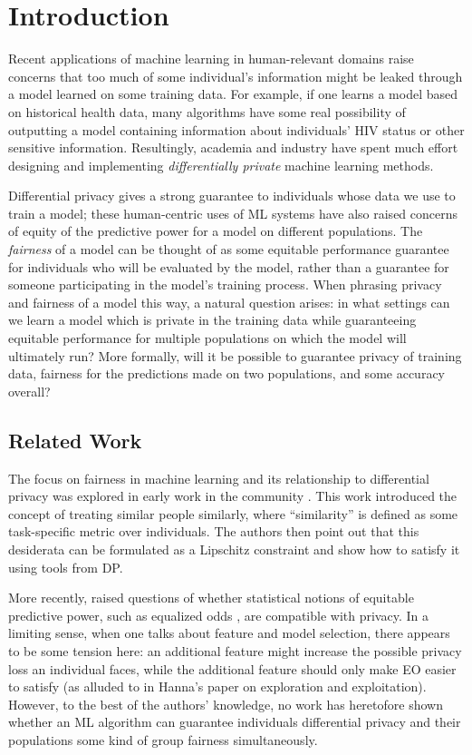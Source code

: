 
\section{Introduction}
Recent applications of machine learning in human-relevant domains
raise concerns that too much of some individual's information might be
leaked through a model learned on some training data. For example, if
one learns a model based on historical health data, many algorithms
have some real possibility of outputting a model containing
information about individuals' HIV status or other sensitive
information.  Resultingly, academia and industry have spent much
effort designing and implementing \emph{differentially private}
machine learning methods.

Differential privacy gives a strong guarantee to individuals whose
data we use to train a model; these human-centric uses of ML systems
have also raised concerns of equity of the predictive power for a
model on different populations. The \emph{fairness} of a model can be
thought of as some equitable performance guarantee for individuals who
will be evaluated by the model, rather than a guarantee for someone
participating in the model's training process. When phrasing privacy
and fairness of a model this way, a natural question arises: in what
settings can we learn a model which is private in the training data
while guaranteeing equitable performance for multiple populations on
which the model will ultimately run? More formally, will it be
possible to guarantee privacy of training data, fairness for the
predictions made on two populations, and some accuracy overall?


\subsection{Related Work}

The focus on fairness in machine learning and its relationship to
differential privacy was explored in early work in the community \citep{dworkfta}. This work introduced the concept of
treating similar people similarly, where ``similarity'' is defined as
some task-specific metric over individuals.  The authors then point
out that this desiderata can be formulated as a Lipschitz constraint
and show how to satisfy it using tools from DP.

More recently, \citet{ekstrandprivfair} raised questions of whether
statistical notions of equitable predictive power, such as equalized
odds \cite{hardteqop}, are compatible with privacy. In a limiting sense,
when one talks about feature and model selection, there appears to be
some tension here: an additional feature might increase the possible
privacy loss an individual faces, while the additional feature should
only make EO easier to satisfy (as alluded to in Hanna's paper on
exploration and exploitation). However, to the best of the authors'
knowledge, no work has heretofore shown whether an ML algorithm can
guarantee individuals differential privacy and their populations some
kind of group fairness simultaneously.

